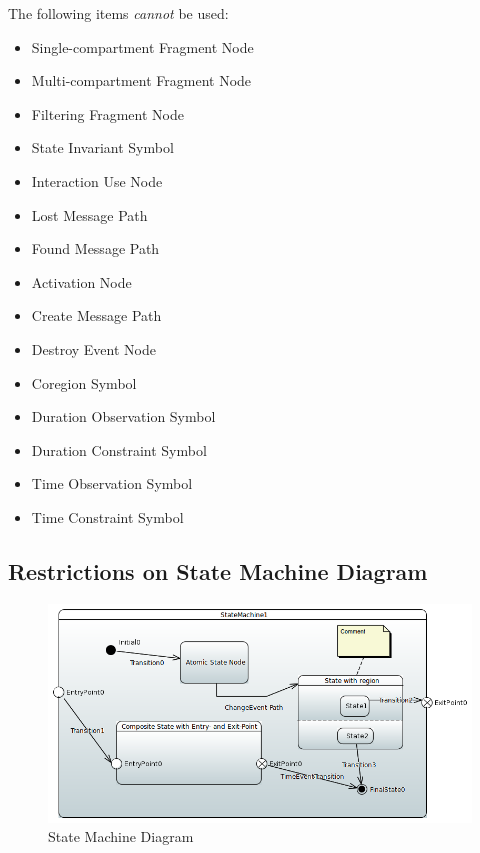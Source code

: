 The following items \emph{cannot} be used:
\begin{itemize}
\item Single-compartment Fragment Node
\item Multi-compartment Fragment Node
\item Filtering Fragment Node
\item State Invariant Symbol
\item Interaction Use Node
\item Lost Message Path
\item Found Message Path
\item Activation Node
\item Create Message Path
\item Destroy Event Node
\item Coregion Symbol
\item Duration Observation Symbol
\item Duration Constraint Symbol
\item Time Observation Symbol
\item Time Constraint Symbol
\end{itemize}

\subsection{Restrictions on State Machine Diagram}



\begin{figure}[ht]
  \centering
  \includegraphics[width=\textwidth]{images/StateMachineDiagram.PNG}
  \caption{State Machine Diagram}
  \label{fig:sm diagram}
\end{figure}


